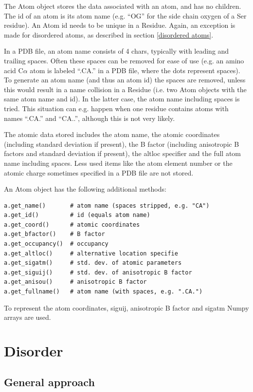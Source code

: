 \documentclass{report}
\begin{document}
The Atom object stores the data associated with an atom, and has no children.
The id of an atom is its atom name (e.g. {}``OG{}'' for the side chain oxygen
of a Ser residue). An Atom id needs to be unique in a Residue. Again, an exception
is made for disordered atoms, as described in section \ref{disordered atoms}.

In a PDB file, an atom name consists of 4 chars, typically with leading and
trailing spaces. Often these spaces can be removed for ease of use (e.g. an
amino acid C\( \alpha  \) atom is labeled {}``.CA.{}'' in a PDB file, where
the dots represent spaces). To generate an atom name (and thus an atom id) the
spaces are removed, unless this would result in a name collision in a Residue
(i.e. two Atom objects with the same atom name and id). In the latter case,
the atom name including spaces is tried. This situation can e.g. happen when
one residue contains atoms with names {}``.CA.{}'' and {}``CA..{}'', although
this is not very likely.

The atomic data stored includes the atom name, the atomic coordinates (including
standard deviation if present), the B factor (including anisotropic B factors
and standard deviation if present), the altloc specifier and the full atom name
including spaces. Less used items like the atom element number or the atomic
charge sometimes specified in a PDB file are not stored.

An Atom object has the following additional methods:

\begin{verbatim}
a.get_name()       # atom name (spaces stripped, e.g. "CA")
a.get_id()         # id (equals atom name)
a.get_coord()      # atomic coordinates
a.get_bfactor()    # B factor
a.get_occupancy()  # occupancy
a.get_altloc()     # alternative location specifie
a.get_sigatm()     # std. dev. of atomic parameters
a.get_siguij()     # std. dev. of anisotropic B factor
a.get_anisou()     # anisotropic B factor
a.get_fullname()   # atom name (with spaces, e.g. ".CA.")
\end{verbatim}

To represent the atom coordinates, siguij, anisotropic B factor and sigatm Numpy
arrays are used.

\section{Disorder}

\subsection{General approach\label{disorder problems}}
\end{document}
